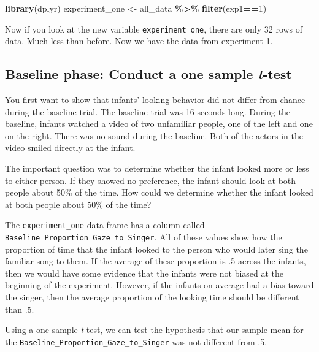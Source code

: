 \documentclass[
]{book}
\newenvironment{Shaded}{\begin{snugshade}}{\end{snugshade}}
\newcommand{\DecValTok}[1]{\textcolor[rgb]{0.00,0.00,0.81}{#1}}
\newcommand{\FunctionTok}[1]{\textcolor[rgb]{0.13,0.29,0.53}{\textbf{#1}}}
\newcommand{\NormalTok}[1]{#1}
\newcommand{\OtherTok}[1]{\textcolor[rgb]{0.56,0.35,0.01}{#1}}
\newcommand{\SpecialCharTok}[1]{\textcolor[rgb]{0.81,0.36,0.00}{\textbf{#1}}}
\begin{document}
\begin{Shaded}
\begin{Highlighting}[]
\FunctionTok{library}\NormalTok{(dplyr)}
\NormalTok{experiment\_one }\OtherTok{\textless{}{-}}\NormalTok{ all\_data }\SpecialCharTok{\%\textgreater{}\%} \FunctionTok{filter}\NormalTok{(exp1}\SpecialCharTok{==}\DecValTok{1}\NormalTok{)}
\end{Highlighting}
\end{Shaded}

Now if you look at the new variable \texttt{experiment\_one}, there are only 32 rows of data. Much less than before. Now we have the data from experiment 1.

\hypertarget{baseline-phase-conduct-a-one-sample-t-test}{%
\subsection{\texorpdfstring{Baseline phase: Conduct a one sample \emph{t}-test}{Baseline phase: Conduct a one sample t-test}}\label{baseline-phase-conduct-a-one-sample-t-test}}

You first want to show that infants' looking behavior did not differ from chance during the baseline trial. The baseline trial was 16 seconds long. During the baseline, infants watched a video of two unfamiliar people, one of the left and one on the right. There was no sound during the baseline. Both of the actors in the video smiled directly at the infant.

The important question was to determine whether the infant looked more or less to either person. If they showed no preference, the infant should look at both people about 50\% of the time. How could we determine whether the infant looked at both people about 50\% of the time?

The \texttt{experiment\_one} data frame has a column called \texttt{Baseline\_Proportion\_Gaze\_to\_Singer}. All of these values show how the proportion of time that the infant looked to the person who would later sing the familiar song to them. If the average of these proportion is .5 across the infants, then we would have some evidence that the infants were not biased at the beginning of the experiment. However, if the infants on average had a bias toward the singer, then the average proportion of the looking time should be different than .5.

Using a one-sample \emph{t}-test, we can test the hypothesis that our sample mean for the \texttt{Baseline\_Proportion\_Gaze\_to\_Singer} was not different from .5.
\end{document}
